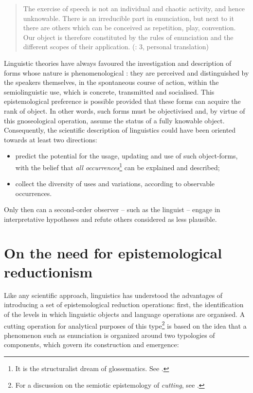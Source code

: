 \documentclass[output=paper]{langscibook}
\begin{document}
\begin{quote}
The exercise of speech is not an individual and chaotic activity, and hence unknowable. There is an irreducible part in enunciation, but next to it there are others which can be conceived as repetition, play, convention. Our object is therefore constituted by the rules of enunciation and the different scopes of their application. (\citealt{Todorov1970}: 3, personal translation)
\end{quote}


Linguistic theories have always favoured the investigation and description of forms whose nature is phenomenological \citep{Piotrowski2018}: they are perceived and distinguished by the speakers themselves, in the spontaneous course of action, within the semiolinguistic use, which is concrete, transmitted and socialised. This epistemological preference is possible provided that these forms can acquire the rank of object. In other words, such forms must be objectivised and, by virtue of this gnoseological operation, assume the status of a fully knowable object. Consequently, the scientific description of linguistics could have been oriented towards at least two directions: 


\begin{itemize}
\item predict the potential for the usage, updating and use of such object-forms, with the belief that \textit{all occurrences}\footnote{It is the structuralist dream of glossematics. See \citet{Bondi2012}.} can be explained and described;

\item collect the diversity of uses and variations, according to observable occurrences.

\end{itemize}


Only then can a second-order observer – such as the linguist – engage in interpretative hypotheses and refute others considered as less plausible.


\section{On the need for epistemological reductionism}

Like any scientific approach, linguistics has understood the advantages of introducing a set of epistemological reduction operations: first, the identification of the levels in which linguistic objects and language operations are organised. A cutting operation for analytical purposes of this type\footnote{For a discussion on the semiotic epistemology of \textit{cutting}, see \citet{Paolucci2010,Paolucci2017,Bondi2011}.} is based on the idea that a phenomenon such as enunciation is organized around two typologies of components, which govern its construction and emergence:
\end{document}
